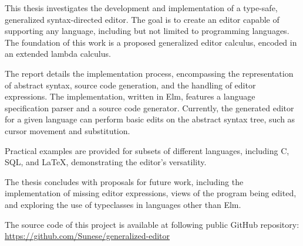 This thesis investigates the development and implementation of a type-safe, generalized syntax-directed editor. The goal is to create an editor capable of supporting any language, including but not limited to programming languages. The foundation of this work is a proposed generalized editor calculus, encoded in an extended lambda calculus.

The report details the implementation process, encompassing the representation of abstract syntax, source code generation, and the handling of editor expressions. The implementation, written in Elm, features a language specification parser and a source code generator. Currently, the generated editor for a given language can perform basic edits on the abstract syntax tree, such as cursor movement and substitution.

Practical examples are provided for subsets of different languages, including C, SQL, and LaTeX, demonstrating the editor's versatility.

The thesis concludes with proposals for future work, including the implementation of missing editor expressions, views of the program being edited, and exploring the use of typeclasses in languages other than Elm.


The source code of this project is available at following public GitHub repository: \url{https://github.com/Sunese/generalized-editor}
